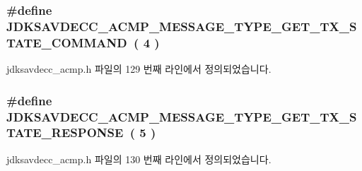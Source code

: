 \subsubsection[{\texorpdfstring{J\+D\+K\+S\+A\+V\+D\+E\+C\+C\+\_\+\+A\+C\+M\+P\+\_\+\+M\+E\+S\+S\+A\+G\+E\+\_\+\+T\+Y\+P\+E\+\_\+\+G\+E\+T\+\_\+\+T\+X\+\_\+\+S\+T\+A\+T\+E\+\_\+\+C\+O\+M\+M\+A\+ND}{JDKSAVDECC_ACMP_MESSAGE_TYPE_GET_TX_STATE_COMMAND}}]{\setlength{\rightskip}{0pt plus 5cm}\#define J\+D\+K\+S\+A\+V\+D\+E\+C\+C\+\_\+\+A\+C\+M\+P\+\_\+\+M\+E\+S\+S\+A\+G\+E\+\_\+\+T\+Y\+P\+E\+\_\+\+G\+E\+T\+\_\+\+T\+X\+\_\+\+S\+T\+A\+T\+E\+\_\+\+C\+O\+M\+M\+A\+ND~( 4 )}\hypertarget{group__acmp__message__type_gae111bf6de86b42a7dd6c8de3128a1eb9}{}\label{group__acmp__message__type_gae111bf6de86b42a7dd6c8de3128a1eb9}


jdksavdecc\+\_\+acmp.\+h 파일의 129 번째 라인에서 정의되었습니다.

\subsubsection[{\texorpdfstring{J\+D\+K\+S\+A\+V\+D\+E\+C\+C\+\_\+\+A\+C\+M\+P\+\_\+\+M\+E\+S\+S\+A\+G\+E\+\_\+\+T\+Y\+P\+E\+\_\+\+G\+E\+T\+\_\+\+T\+X\+\_\+\+S\+T\+A\+T\+E\+\_\+\+R\+E\+S\+P\+O\+N\+SE}{JDKSAVDECC_ACMP_MESSAGE_TYPE_GET_TX_STATE_RESPONSE}}]{\setlength{\rightskip}{0pt plus 5cm}\#define J\+D\+K\+S\+A\+V\+D\+E\+C\+C\+\_\+\+A\+C\+M\+P\+\_\+\+M\+E\+S\+S\+A\+G\+E\+\_\+\+T\+Y\+P\+E\+\_\+\+G\+E\+T\+\_\+\+T\+X\+\_\+\+S\+T\+A\+T\+E\+\_\+\+R\+E\+S\+P\+O\+N\+SE~( 5 )}\hypertarget{group__acmp__message__type_gaf9b24b0190d5bf9cae7e37c4a31cda12}{}\label{group__acmp__message__type_gaf9b24b0190d5bf9cae7e37c4a31cda12}


jdksavdecc\+\_\+acmp.\+h 파일의 130 번째 라인에서 정의되었습니다.

